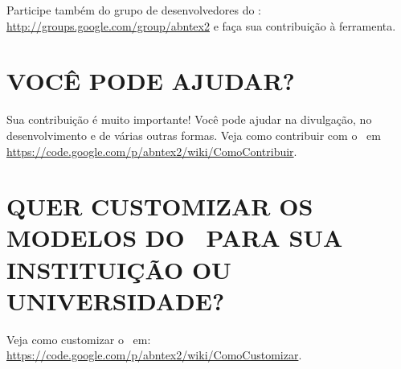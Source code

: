 Participe também do grupo de desenvolvedores do \abnTeX:
\url{http://groups.google.com/group/abntex2} e faça sua contribuição à
ferramenta.

\section{\uppercase{Você pode ajudar?}}

Sua contribuição é muito importante! Você pode ajudar na divulgação, no
desenvolvimento e de várias outras formas. Veja como contribuir com o \abnTeX\
em \url{https://code.google.com/p/abntex2/wiki/ComoContribuir}.

\section{\uppercase{Quer customizar os modelos do \abnTeX\ para sua instituição ou
universidade?}}

Veja como customizar o \abnTeX\ em:
\url{https://code.google.com/p/abntex2/wiki/ComoCustomizar}.